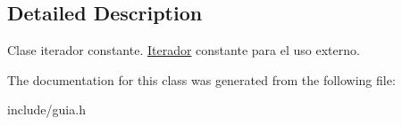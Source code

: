 \subsection{Detailed Description}
Clase iterador constante. \hyperlink{classGuia__Tlf_1_1Iterador}{Iterador} constante para el uso externo. 

The documentation for this class was generated from the following file\+:\begin{DoxyCompactItemize}
\item 
include/guia.\+h\end{DoxyCompactItemize}
